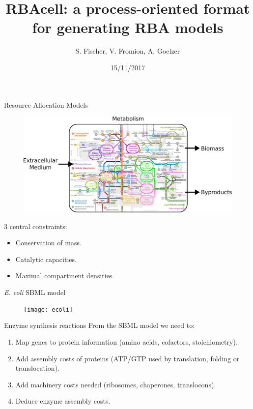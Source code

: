 \documentclass{beamer}
\begin{document}
\title{RBAcell: a process-oriented format for generating RBA models}
\author{S. Fischer, V. Fromion, A. Goelzer}
\date{15/11/2017}
\maketitle

\begin{frame}{Resource Allocation Models}
  \begin{figure}
    \centering
    \includegraphics[width=\linewidth]{intro}
  \end{figure}
  3 central constraints:
  \begin{itemize}
    \item Conservation of mass.
    \item Catalytic capacities.
    \item Maximal compartment densities.
  \end{itemize}
\end{frame}

\begin{frame}{\textit{E. coli} SBML model}
  \begin{figure}
    \centering
    \texttt{[image: ecoli]}
  \end{figure}
\end{frame}

\begin{frame}{Enzyme synthesis reactions}
  From the SBML model we need to:
  \begin{enumerate}
    \item Map genes to protein information (amino acids, cofactors, stoichiometry).
    \item Add assembly costs of proteins (ATP/GTP used by translation, folding or translocation).
    \item Add machinery costs needed (ribosomes, chaperones, translocons).
    \item Deduce enzyme assembly costs.
  \end{enumerate}
\end{frame}
\end{document}
